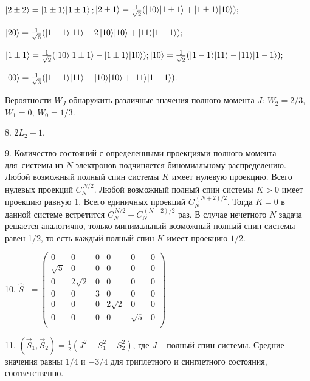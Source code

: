 \vspace{-\parskip+1mm}
$\ket{2\pm2}=\ket{1\pm1}\!\ket{1\pm1};$\quad $\ket{2\pm1} = \frac{1}{\sqrt2}(\ket{10}\!\ket{1\pm1} + \ket{1\pm1}\!\ket{10});$\par
\vspace{-\parskip+1mm}
$\ket{20} = \frac{1}{\sqrt6}(\ket{1-1}\!\ket{11} + 2\ket{10}\!\ket{10}+\ket{11}\!\ket{1-1});$\par
\vspace{-\parskip+1mm}
$\ket{1\pm1} = \frac{1}{\sqrt2}(\ket{10}\!\ket{1\pm1} - \ket{1\pm1}\!\ket{10});$\quad$\ket{10} = \frac{1}{\sqrt2}(\ket{1-1}\!\ket{11} - \ket{11}\!\ket{1-1});$\par
\vspace{-\parskip+1mm}
$\ket{00} = \frac{1}{\sqrt3}(\ket{1-1}\!\ket{11} - \ket{10}\!\ket{10}+\ket{11}\!\ket{1-1}).$\par
\vspace{-\parskip+1mm}
Вероятности $W_J$ обнаружить различные значения полного момента $J$: $W_{2} = 2/3$, $W_{1} = 0$, $W_{0} = 1/3$.
\par
8. $2L_2+1$.\par
9. Количество состояний с определенными проекциями полного момента для~системы из $N$ электронов подчиняется биномиальному распределению. Любой возможный полный спин системы $K$ имеет нулевую проекцию. Всего нулевых проекций $C_{N}^{\,N/2}$. Любой возможный полный спин системы $K>0$ имеет проекцию равную 1. Всего единичных проекций $C_{N}^{\,(N+2)/2}$. Тогда $K=0$ в данной системе встретится $C_{N}^{\,N/2} - C_{N}^{\,(N+2)/2}$ раз. В случае нечетного $N$ задача решается аналогично, только минимальный возможный полный спин системы равен 1/2, то есть каждый полный спин $K$ имеет проекцию $1/2$. \par
10. $\widehat{S}_-=\begin{pmatrix}
0 & 0 & 0 & 0 & 0 & 0 \\
\sqrt{5} & 0 & 0 & 0 & 0 & 0\\
0 & 2\sqrt{2} & 0 & 0 & 0 & 0\\
0 & 0 & 3 & 0 & 0 & 0\\
0 & 0 & 0 & 2\sqrt{2} & 0 & 0\\
0 & 0 & 0 & 0 & \sqrt{5} & 0\\
\end{pmatrix}$
\par
11. $(\vec{S}_1,\vec{S}_2)=\frac{1}{2}( J^2 - S_1^2-S_2^2)$, где $J$ – полный спин системы. Средние значения равны $1/4$ и $-3/4$ для триплетного и синглетного состояния, соответственно.\par

